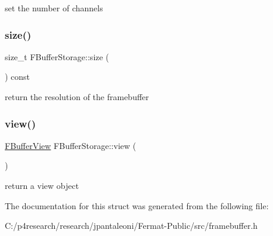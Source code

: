 set the number of channels \mbox{\label{struct_f_buffer_storage_a3b5a5c5f7aa80d8dc8e34f34cba1e6fc}} 
\subsubsection{\texorpdfstring{size()}{size()}}
{\footnotesize\ttfamily size\+\_\+t F\+Buffer\+Storage\+::size (\begin{DoxyParamCaption}{ }\end{DoxyParamCaption}) const\hspace{0.3cm}{\ttfamily [inline]}}

return the resolution of the framebuffer \mbox{\label{struct_f_buffer_storage_a68f01c04fecd7e6293cfafcf2cc0b719}} 
\subsubsection{\texorpdfstring{view()}{view()}}
{\footnotesize\ttfamily \hyperlink{struct_f_buffer_view}{F\+Buffer\+View} F\+Buffer\+Storage\+::view (\begin{DoxyParamCaption}{ }\end{DoxyParamCaption})\hspace{0.3cm}{\ttfamily [inline]}}

return a view object 

The documentation for this struct was generated from the following file\+:\begin{DoxyCompactItemize}
\item 
C\+:/p4research/research/jpantaleoni/\+Fermat-\/\+Public/src/framebuffer.\+h\end{DoxyCompactItemize}

